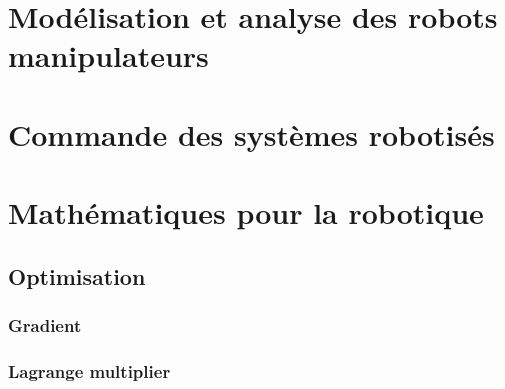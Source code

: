 \documentclass[letterpaper,oneside,french]{book}
\begin{document}


{\hypersetup{linkcolor=black}
\tableofcontents
\newpage
}


\part{Modélisation et analyse des robots manipulateurs}
\label{sec:manip}









\part{Commande des systèmes robotisés}
\label{sec:control}









\part{Mathématiques pour la robotique}



\chapter{Optimisation}
\section{Gradient}
\section{Lagrange multiplier}

\appendix



\end{document}
